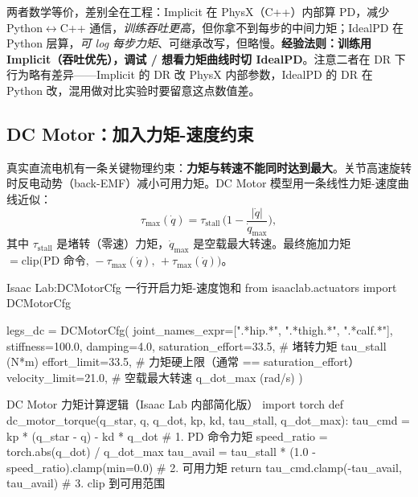 \begin{insight}\label{ins:rlmc-act-implicit}
两者数学等价，差别全在工程：Implicit 在 PhysX（C++）内部算 PD，减少 Python$\leftrightarrow$C++ 通信，\emph{训练吞吐更高}，但你拿不到每步的中间力矩；IdealPD 在 Python 层算，\emph{可 log 每步力矩}、可继承改写，但略慢。\textbf{经验法则：训练用 Implicit（吞吐优先），调试 / 想看力矩曲线时切 IdealPD}。注意二者在 DR 下行为略有差异——Implicit 的 DR 改 PhysX 内部参数，IdealPD 的 DR 在 Python 改，混用做对比实验时要留意这点数值差。
\end{insight}

\subsection{DC Motor：加入力矩-速度约束}
\label{sec:rlmc-act-dcmotor}

真实直流电机有一条关键物理约束：\textbf{力矩与转速不能同时达到最大}。关节高速旋转时反电动势（back-EMF）减小可用力矩。DC Motor 模型用一条线性力矩-速度曲线近似：
\begin{equation}
\tau_{\max}(\dot q) = \tau_{\mathrm{stall}}\,\Big(1 - \frac{|\dot q|}{\dot q_{\max}}\Big),
\label{eq:rlmc-act-torquespeed}
\end{equation}
其中 $\tau_{\mathrm{stall}}$ 是堵转（零速）力矩，$\dot q_{\max}$ 是空载最大转速。最终施加力矩 $= \mathrm{clip}\big(\text{PD 命令},\,-\tau_{\max}(\dot q),\,+\tau_{\max}(\dot q)\big)$。

\begin{codebox}[Python]{Isaac Lab:DCMotorCfg 一行开启力矩-速度饱和}
from isaaclab.actuators import DCMotorCfg

legs_dc = DCMotorCfg(
    joint_names_expr=[".*hip.*", ".*thigh.*", ".*calf.*"],
    stiffness=100.0, damping=4.0,
    saturation_effort=33.5,  # 堵转力矩 tau_stall (N*m)
    effort_limit=33.5,       # 力矩硬上限（通常 == saturation_effort）
    velocity_limit=21.0,     # 空载最大转速 q_dot_max (rad/s)
)
\end{codebox}

\begin{codebox}[Python]{DC Motor 力矩计算逻辑（Isaac Lab 内部简化版）}
import torch
def dc_motor_torque(q_star, q, q_dot, kp, kd, tau_stall, q_dot_max):
    tau_cmd = kp * (q_star - q) - kd * q_dot          # 1. PD 命令力矩
    speed_ratio = torch.abs(q_dot) / q_dot_max
    tau_avail = tau_stall * (1.0 - speed_ratio).clamp(min=0.0)  # 2. 可用力矩
    return tau_cmd.clamp(-tau_avail, tau_avail)        # 3. clip 到可用范围
\end{codebox}

